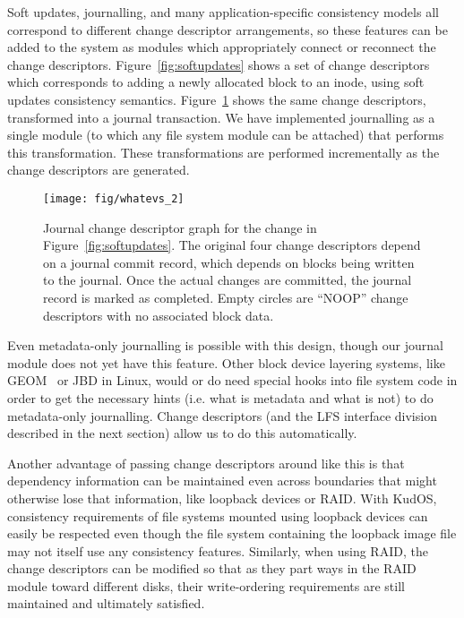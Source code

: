 Soft updates, journalling, and many application-specific consistency models all
correspond to different change descriptor arrangements, so these features can be
added to the system as modules which appropriately connect or reconnect the
change descriptors. Figure~\ref{fig:softupdates} shows a set of change
descriptors which corresponds to adding a newly allocated block to an inode,
using soft updates consistency semantics. Figure~\ref{fig:journal} shows the
same change descriptors, transformed into a journal transaction. We have
implemented journalling as a single module (to which any file system module
can be attached) that performs this transformation. These transformations
are performed incrementally as the change descriptors are generated.

\begin{figure}
  \centering
  \texttt{[image: fig/whatevs\_2]}%
  \caption{\label{fig:journal} Journal change descriptor graph for the
  change in Figure~\ref{fig:softupdates}.  The original four change
  descriptors depend on a journal commit record, which depends on blocks
  being written to the journal.  Once the actual changes are committed, the
  journal record is marked as completed.  Empty circles are ``NOOP'' change
  descriptors with no associated block data.  }
\end{figure}

Even metadata-only journalling is possible with this design, though our journal
module does not yet have this feature. Other block device layering systems, like
GEOM~\cite{geom} or JBD in Linux, would or do need special hooks into file system
code in order to get the necessary hints (i.e. what is metadata and what is not)
to do metadata-only journalling. Change descriptors (and the LFS interface
division described in the next section) allow us to do this automatically.

Another advantage of passing change descriptors around like this is that
dependency information can be maintained even across boundaries that might
otherwise lose that information, like loopback devices or RAID. With KudOS,
consistency requirements of file systems mounted using loopback devices can
easily be respected even though the file system containing the loopback image
file may not itself use any consistency features. Similarly, when using RAID,
the change descriptors can be modified so that as they part ways in the RAID
module toward different disks, their write-ordering requirements are still
maintained and ultimately satisfied.

